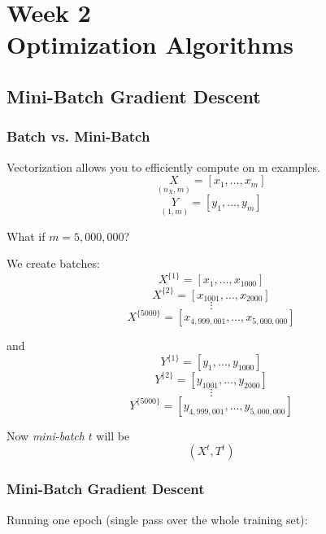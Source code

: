 
\chapter{Week 2 \\ Optimization Algorithms}





\section{Mini-Batch Gradient Descent}

\subsection*{Batch vs. Mini-Batch}

Vectorization allows you to efficiently compute on m examples.
\[ \underset{(n_X, m)}{X} = [x_1, \ldots, x_m] \]
\[ \underset{(1, m)}{Y} = [y_1, \ldots, y_m] \]

What if $m=5,000,000$?

We create batches:
\[ X^{\{1\}}= [x_1,\ldots, x_{1000} ] \]
\[ X^{\{2\}}= [x_{1001},\ldots, x_{2000} ] \]
\[ \vdots \]
\[ X^{\{5000\}}= [x_{4,999,001},\ldots, x_{5,000,000}] \]

and
\[  Y^{\{1\}}= [y_1,\ldots, y_{1000}] \]
\[  Y^{\{2\}}= [y_{1001},\ldots, y_{2000}] \]
\[  \vdots \]
\[  Y^{\{5000\}}= [y_{4,999,001},\ldots, y_{5,000,000}] \]

Now \textit{mini-batch} $t$ will be
\[ (X^{t} , T^{t}) \]

\newpage

\subsection*{Mini-Batch Gradient Descent}

Running one epoch (single pass over the whole training set):

